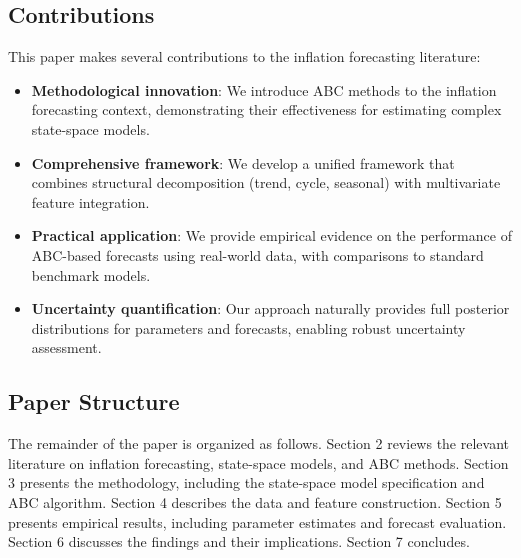 \subsection{Contributions}

This paper makes several contributions to the inflation forecasting literature:

\begin{itemize}
    \item \textbf{Methodological innovation}: We introduce ABC methods to the inflation forecasting context, demonstrating their effectiveness for estimating complex state-space models.
    
    \item \textbf{Comprehensive framework}: We develop a unified framework that combines structural decomposition (trend, cycle, seasonal) with multivariate feature integration.
    
    \item \textbf{Practical application}: We provide empirical evidence on the performance of ABC-based forecasts using real-world data, with comparisons to standard benchmark models.
    
    \item \textbf{Uncertainty quantification}: Our approach naturally provides full posterior distributions for parameters and forecasts, enabling robust uncertainty assessment.
\end{itemize}

\subsection{Paper Structure}

The remainder of the paper is organized as follows. Section 2 reviews the relevant literature on inflation forecasting, state-space models, and ABC methods. Section 3 presents the methodology, including the state-space model specification and ABC algorithm. Section 4 describes the data and feature construction. Section 5 presents empirical results, including parameter estimates and forecast evaluation. Section 6 discusses the findings and their implications. Section 7 concludes.
